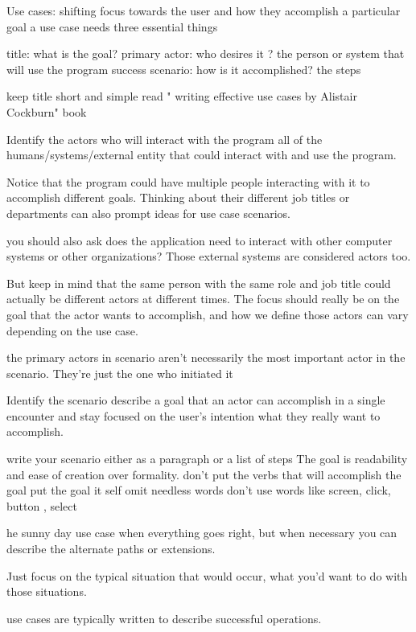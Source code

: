 
Use cases: shifting focus towards the user and how they accomplish a particular goal
  a use case needs three essential things

  title: what is the goal?
  primary actor: who desires it ?    the person or system that will use the program
  success scenario: how is it accomplished?  the steps

  keep title short and simple 
  read  " writing effective use cases by Alistair Cockburn" book 

  Identify the actors 
    who will interact with the program 
    all of the humans/systems/external entity that could interact with and use the program.

    Notice that 
    the program could have multiple people interacting with it to accomplish different goals.
    Thinking about their different job titles or departments can also prompt ideas for use case scenarios. 

    you should also ask does the application need to interact with other computer systems or other organizations?
    Those external systems are considered actors too.

    But keep in mind that the same person with the same role and job title could actually be different actors at different times.
    The focus should really be on the goal that the actor wants to accomplish, 
    and how we define those actors can vary depending on the use case. 

    the primary actors in scenario aren't necessarily the most important actor in the scenario.
    They're just the one who initiated it 

  Identify the scenario 
    describe a goal that an actor can accomplish in a single encounter and stay focused on the user's intention
    what they really want to accomplish. 
  
    write your scenario either as a paragraph or a list of steps 
    The goal is readability and ease of creation over formality. 
    don't put the verbs that will accomplish the goal 
    put the goal it self 
    omit needless words 
    don't use words like screen, click, button , select

    he sunny day use case when everything goes right,
    but when necessary you can describe the alternate paths or extensions.

    Just focus on the typical situation that would occur, what you'd want to do with those situations.

use cases are typically written to describe successful operations.

